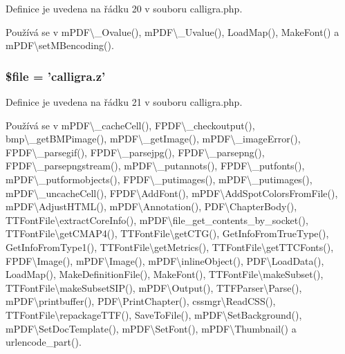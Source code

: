 Definice je uvedena na řádku 20 v souboru calligra.\-php.



Používá se v m\-P\-D\-F\textbackslash{}\-\_\-\-Ovalue(), m\-P\-D\-F\textbackslash{}\-\_\-\-Uvalue(), Load\-Map(), Make\-Font() a m\-P\-D\-F\textbackslash{}set\-M\-Bencoding().

\hypertarget{calligra_8php_aa1bfbd27060176201b271918dff57e8f}{
\subsubsection[{\$file}]{\setlength{\rightskip}{0pt plus 5cm}\$file = 'calligra.\-z'}}\label{calligra_8php_aa1bfbd27060176201b271918dff57e8f}


Definice je uvedena na řádku 21 v souboru calligra.\-php.



Používá se v m\-P\-D\-F\textbackslash{}\-\_\-cache\-Cell(), F\-P\-D\-F\textbackslash{}\-\_\-checkoutput(), bmp\textbackslash{}\-\_\-get\-B\-M\-Pimage(), m\-P\-D\-F\textbackslash{}\-\_\-get\-Image(), m\-P\-D\-F\textbackslash{}\-\_\-image\-Error(), F\-P\-D\-F\textbackslash{}\-\_\-parsegif(), F\-P\-D\-F\textbackslash{}\-\_\-parsejpg(), F\-P\-D\-F\textbackslash{}\-\_\-parsepng(), F\-P\-D\-F\textbackslash{}\-\_\-parsepngstream(), m\-P\-D\-F\textbackslash{}\-\_\-putannots(), F\-P\-D\-F\textbackslash{}\-\_\-putfonts(), m\-P\-D\-F\textbackslash{}\-\_\-putformobjects(), F\-P\-D\-F\textbackslash{}\-\_\-putimages(), m\-P\-D\-F\textbackslash{}\-\_\-putimages(), m\-P\-D\-F\textbackslash{}\-\_\-uncache\-Cell(), F\-P\-D\-F\textbackslash{}\-Add\-Font(), m\-P\-D\-F\textbackslash{}\-Add\-Spot\-Colors\-From\-File(), m\-P\-D\-F\textbackslash{}\-Adjust\-H\-T\-M\-L(), m\-P\-D\-F\textbackslash{}\-Annotation(), P\-D\-F\textbackslash{}\-Chapter\-Body(), T\-T\-Font\-File\textbackslash{}extract\-Core\-Info(), m\-P\-D\-F\textbackslash{}file\-\_\-get\-\_\-contents\-\_\-by\-\_\-socket(), T\-T\-Font\-File\textbackslash{}get\-C\-M\-A\-P4(), T\-T\-Font\-File\textbackslash{}get\-C\-T\-G(), Get\-Info\-From\-True\-Type(), Get\-Info\-From\-Type1(), T\-T\-Font\-File\textbackslash{}get\-Metrics(), T\-T\-Font\-File\textbackslash{}get\-T\-T\-C\-Fonts(), F\-P\-D\-F\textbackslash{}\-Image(), m\-P\-D\-F\textbackslash{}\-Image(), m\-P\-D\-F\textbackslash{}inline\-Object(), P\-D\-F\textbackslash{}\-Load\-Data(), Load\-Map(), Make\-Definition\-File(), Make\-Font(), T\-T\-Font\-File\textbackslash{}make\-Subset(), T\-T\-Font\-File\textbackslash{}make\-Subset\-S\-I\-P(), m\-P\-D\-F\textbackslash{}\-Output(), T\-T\-F\-Parser\textbackslash{}\-Parse(), m\-P\-D\-F\textbackslash{}printbuffer(), P\-D\-F\textbackslash{}\-Print\-Chapter(), cssmgr\textbackslash{}\-Read\-C\-S\-S(), T\-T\-Font\-File\textbackslash{}repackage\-T\-T\-F(), Save\-To\-File(), m\-P\-D\-F\textbackslash{}\-Set\-Background(), m\-P\-D\-F\textbackslash{}\-Set\-Doc\-Template(), m\-P\-D\-F\textbackslash{}\-Set\-Font(), m\-P\-D\-F\textbackslash{}\-Thumbnail() a urlencode\-\_\-part().

